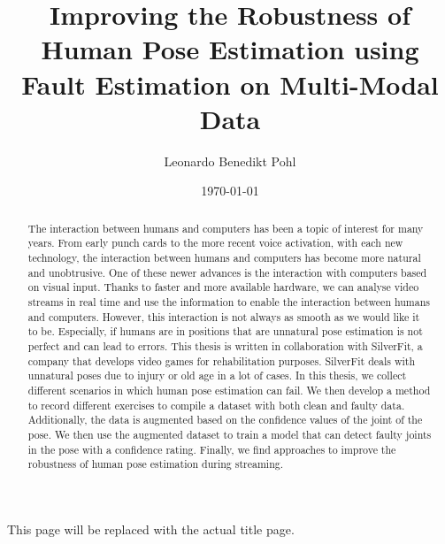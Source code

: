 
\title{Improving the Robustness of Human Pose Estimation using Fault Estimation on Multi-Modal Data}
\author{Leonardo Benedikt Pohl}

\date{\today}

This page will be replaced with the actual title page.

\clearpage

\begin{abstract}
    
  The interaction between humans and computers has been a topic of interest for many years. From early punch cards to the more recent voice activation, with each new technology, the interaction between humans and computers has become more natural and unobtrusive. One of these newer advances is the interaction with computers based on visual input. Thanks to faster and more available hardware, we can analyse video streams in real time and use the information to enable the interaction between humans and computers. However, this interaction is not always as smooth as we would like it to be. Especially, if humans are in positions that are unnatural pose estimation is not perfect and can lead to errors. This thesis is written in collaboration with SilverFit, a company that develops video games for rehabilitation purposes. SilverFit deals with unnatural poses due to injury or old age in a lot of cases. In this thesis, we collect different scenarios in which human pose estimation can fail. We then develop a method to record different exercises to compile a dataset with both clean and faulty data.  Additionally, the data is augmented based on the confidence values of the joint of the pose. We then use the augmented dataset to train a model that can detect faulty joints in the pose with a confidence rating. Finally, we find approaches to improve the robustness of human pose estimation during streaming.
  
\end{abstract}
